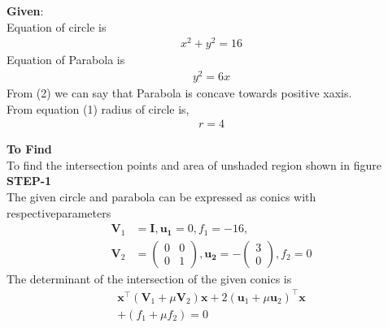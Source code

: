 \documentclass[10pt,a4paper]{report}
\newcommand{\myvec}[1]{\ensuremath{\begin{pmatrix}#1\end{pmatrix}}}
\let\vec\mathbf
\let\vec\mathbf
\providecommand{\brak}[1]{\ensuremath{\left(#1\right)}}
\begin{document}
\begin{multicols}{2}
\raggedright \textbf{Given}:\vspace{2mm}\\
Equation of circle is \\\vspace{1mm}
\begin{align}
x^2 + y^2 = 16
\end{align}
Equation of Parabola is \\ \vspace{1mm}
\begin{align}
y^2 = 6x 
\end{align}
From (2) we can say that Parabola is concave towards positive xaxis.\\ \vspace{2mm}
From equation (1) radius of circle is,\\ \vspace{1mm}
\begin{align}
r= 4
\end{align}

\textbf{To Find }\vspace{2mm}\\
To find the intersection points and area of unshaded region shown in figure\vspace{2mm}  \\ 
\textbf{STEP-1}\vspace{2mm}\\
\fi
The given circle and parabola can be expressed as conics with respectiveparameters
\begin{align}
	\vec{V}_1&=\vec{I},
\vec{u_1}=0,
f_1=-16,
\\
	\vec{V}_2&=\myvec{
0 & 0\\
0 & 1
},
\vec{u_2}= -\myvec{
3\\
0
},
f_2=0
\end{align} 
The determinant of the intersection of the given conics is 
\iffalse
\begin{align}
	\vec{x}^{\top}\brak{\vec{V}_1 + \mu\vec{V}_2}\vec{x}+2 \brak{\vec{u}_1+\mu \vec{u}_2}^{\top} \vec{x} 
	\\
	+ \brak{f_1+\mu f_2}= 0
    \end{align}
    

\end{multicols}
\end{document}
